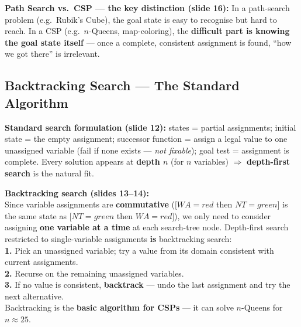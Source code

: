 \documentclass[12pt, a4paper]{article}
\begin{document}
\vspace{0.4em}

\noindent\textbf{Path Search vs.\ CSP — the key distinction (slide 16):} In a path-search problem (e.g.\ Rubik's Cube), the goal state is easy to recognise but hard to reach. In a CSP (e.g.\ $n$-Queens, map-coloring), the \textbf{difficult part is knowing the goal state itself} — once a complete, consistent assignment is found, ``how we got there'' is irrelevant.

\subsection{Backtracking Search — The Standard Algorithm}

\noindent\textbf{Standard search formulation (slide 12):} states = partial assignments; initial state = the empty assignment; successor function = assign a legal value to one unassigned variable (fail if none exists — \emph{not fixable}); goal test = assignment is complete. Every solution appears at \textbf{depth $n$} (for $n$ variables) $\Rightarrow$ \textbf{depth-first search} is the natural fit.

\vspace{0.4em}

\begin{mdframed}[style=notesframe]
\textbf{Backtracking search (slides 13--14):}\\[0.3em]
Since variable assignments are \textbf{commutative} ($[WA{=}red$ then $NT{=}green]$ is the same state as $[NT{=}green$ then $WA{=}red]$), we only need to consider assigning \textbf{one variable at a time} at each search-tree node. Depth-first search restricted to single-variable assignments \textbf{is} backtracking search:\\[0.3em]
\textbf{1.} Pick an unassigned variable; try a value from its domain consistent with current assignments.\\
\textbf{2.} Recurse on the remaining unassigned variables.\\
\textbf{3.} If no value is consistent, \textbf{backtrack} — undo the last assignment and try the next alternative.\\[0.3em]
Backtracking is the \textbf{basic algorithm for CSPs} — it can solve $n$-Queens for $n \approx 25$.
\end{mdframed}

\end{document}

